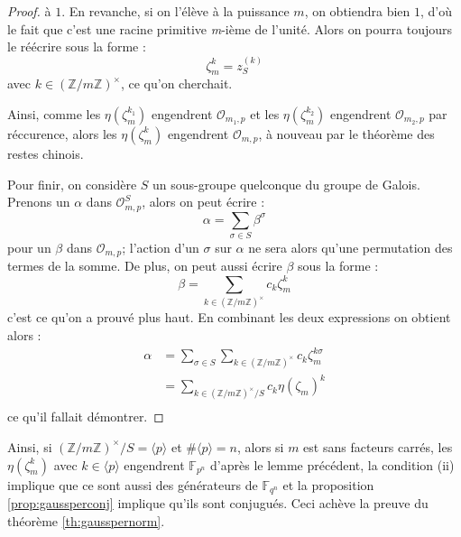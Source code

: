 \documentclass[a4paper]{article} %
\numberwithin{section}{part}
\numberwithin{equation}{section}
\newcommand\nroot[1]{\textit{#1}-ième}
\newcommand\zmodninv[1]{(\mathbb{Z}/#1\mathbb{Z})^{\times}}
\newcommand\GF[1]{\mathbb{F}_{#1}}
\newcommand\EO{\mathcal{O}}
\newcommand\groupgen[1]{\langle{#1}\rangle}
\begin{document}
\begin{proof}
à $1$. En revanche, si on l'élève à la puissance $m$, on obtiendra bien $1$, 
d'où le fait que c'est une racine primitive \nroot{m} de l'unité. Alors on 
pourra toujours le réécrire sous la forme : 
\[\zeta_m^k = z_S^{(k)}\]
avec $k\in\zmodninv{m}$, ce qu'on cherchait.\par
\fi
Ainsi, comme les $\eta(\zeta_m^{k_1})$ engendrent $\EO_{m_1,p}$ et les 
$\eta(\zeta_m^{k_2})$ engendrent $\EO_{m_2,p}$ par réccurence, alors les 
$\eta(\zeta_m^k)$ engendrent $\EO_{m,p}$, à nouveau par le théorème des restes 
chinois.\par
Pour finir, on considère $S$ un sous-groupe quelconque du groupe de Galois. 
Prenons un $\alpha$ dans $\EO_{m,p}^S$, alors on peut écrire :
\begin{equation}
\alpha = \sum_{\sigma\in S}{\beta^{\sigma}}
\end{equation}
pour un $\beta$ dans $\EO_{m,p}$; l'action d'un $\sigma$ sur $\alpha$ ne sera 
alors qu'une permutation des termes de la somme. De plus, on peut aussi écrire 
$\beta$ sous la forme :
\begin{equation}
\beta = \sum_{k\in\zmodninv{m}}{c_{k}\zeta_m^{k}}
\end{equation}
c'est ce qu'on a prouvé plus haut. En combinant les deux expressions on obtient 
alors :
\begin{align*}
\alpha &= \sum_{\sigma\in
S}{\sum_{k\in\zmodninv{m}}{c_{k}\zeta_m^{k\sigma}}}\\
&= \sum_{k\in\zmodninv{m}/S}{c_k\eta(\zeta_m)^{k}}\\
\end{align*}
ce qu'il fallait démontrer.
\end{proof}

Ainsi, si $\zmodninv{m}/S = \groupgen{p}$ et $\#\groupgen{p} = n$, alors si $m$ 
est sans facteurs carrés, les $\eta(\zeta_m^k)$ avec $k\in\groupgen{p}$ 
engendrent $\GF{p^n}$ d'après le lemme précédent, la condition (ii) implique que
ce sont aussi des générateurs de $\GF{q^n}$ et la proposition 
\ref{prop:gaussperconj} implique qu'ils sont conjugués. Ceci achève la preuve du
théorème \ref{th:gausspernorm}.
\end{document}
